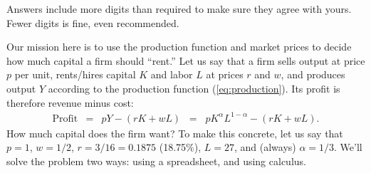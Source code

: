 \documentclass[12pt]{exam}
\renewcommand{\log}{\ln}
\begin{document}
\begin{questions}

\begin{solution}
Answers include more digits than required to make sure they agree with yours.
Fewer digits is fine, even recommended.
\end{solution}

Our mission here is to use the production function
and market prices
to decide how much capital a firm should ``rent.''
Let us say that a firm sells output at price $p$ per unit,
rents/hires capital $K$ and labor $L$ at prices $r$ and $w$,
and produces output $Y$ according to the production function (\ref{eq:production}).
Its profit is therefore revenue minus cost:
\begin{eqnarray}
    \mbox{Profit} &=& p Y - (rK + wL)
            \;\;=\;\; p K^\alpha L^{1-\alpha} - (rK + wL) .
            \label{eq:profit}
\end{eqnarray}
How much capital does the firm want?
To make this concrete, let us say that
$ p = 1$, $w = 1/2$, $r = 3/16 = 0.1875 $ (18.75\%), $L=27$,
and (always) $\alpha = 1/3$.
We'll solve the problem two ways:
using a spreadsheet, and using calculus.


\end{questions}
\end{document}
